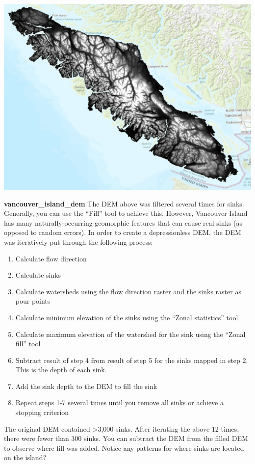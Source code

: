 \documentclass[
]{book}
\providecommand{\tightlist}{%
  \setlength{\itemsep}{0pt}\setlength{\parskip}{0pt}}
\begin{document}
\includegraphics[width=1\linewidth]{images/02-vancouver-island-dem}

\textbf{vancouver\_island\_dem}
The DEM above was filtered several times for sinks. Generally, you can use the ``Fill'' tool to achieve this. However, Vancouver Island has many naturally-occurring geomorphic features that can cause real sinks (as opposed to random errors). In order to create a depressionless DEM, the DEM was iteratively put through the following process:

\begin{enumerate}
\def\labelenumi{\arabic{enumi}.}
\tightlist
\item
  Calculate flow direction
\item
  Calculate sinks
\item
  Calculate watersheds using the flow direction raster and the sinks raster as pour points
\item
  Calculate minimum elevation of the sinks using the ``Zonal statistics'' tool
\item
  Calculate maximum elevation of the watershed for the sink using the ``Zonal fill'' tool
\item
  Subtract result of step 4 from result of step 5 for the sinks mapped in step 2. This is the depth of each sink.
\item
  Add the sink depth to the DEM to fill the sink
\item
  Repeat steps 1-7 several times until you remove all sinks or achieve a stopping criterion
\end{enumerate}

The original DEM contained \textgreater3,000 sinks. After iterating the above 12 times, there were fewer than 300 sinks. You can subtract the DEM from the filled DEM to observe where fill was added. Notice any patterns for where sinks are located on the island?
\end{document}
